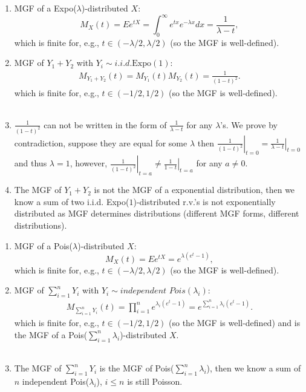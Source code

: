 \begin{Solution}{1.21}
		\begin{enumerate}
			\item   MGF of a Expo($\lambda$)-distributed $X$: $$M_X(t)=Ee^{tX}=\int_{0}^{\infty} e^{tx}e^{-\lambda x} dx=  \frac{1}{\lambda -t},$$ {which is finite for, e.g., $t\in (-\lambda/2, \lambda/2)$ (so the MGF is well-defined)}.
			\item {MGF of $Y_1+Y_2$} with $Y_i\sim i.i.d.\text{Expo}(1)$:
			\begin{align*}
				M_{Y_1+Y_2}(t) = M_{Y_1}(t)M_{Y_2}(t)=\frac{1}{(1 -t)^2}.
			\end{align*}
			{which is finite for, e.g., $t\in (-1/2, 1/2)$ (so the MGF is well-defined).}\\~\\
			\item $\frac{1}{(1 -t)^2}$ can not be written in the form of $\frac{1}{\lambda -t}$ for any $\lambda$'s. We prove by contradiction, suppose they are equal for some $\lambda$ then $\left.\frac{1}{(1 -t)^2}\right|_{t=0}=\left.\frac{1}{\lambda -t}\right|_{t=0}$ and thus $\lambda=1$, however, $\left.\frac{1}{(1 -t)^2}\right|_{t=a}\neq \left.\frac{1}{1 -t}\right|_{t=a}$ for any $a\neq 0$.
			\item {The MGF of  $Y_1+Y_2$ is not the MGF of a exponential distribution}, then we know  a sum of two i.i.d. Expo($1$)-distributed r.v.'s is not exponentially distributed as MGF determines distributions (different MGF forms, different distributions).
		\end{enumerate}
	
\end{Solution}
\begin{Solution}{1.22}
		\begin{enumerate}
				\item {MGF of a Pois($\lambda$)-distributed $X$}: $$M_X(t)=Ee^{tX} =e^{\lambda (e^t-1)},$$ {which is finite for, e.g., $t\in (-\lambda/2, \lambda/2)$ (so the MGF is well-defined)}.
			\item {MGF of $\sum_{i=1}^{n} Y_i$} with $Y_i\sim \textit{independent  Pois}(\lambda_i)$:
			\begin{align*}
				M_{\sum_{i=1}^{n}Y_i}(t) =\prod_{i=1}^{n} e^{\lambda_i (e^t-1) }=e^{\sum_{i=1}^{n} \lambda_i (e^t-1) }.
			\end{align*}
			{which is finite for, e.g., $t\in (-1/2, 1/2)$ (so the MGF is well-defined) and is the MGF of a Pois($\sum_{i=1}^{n} \lambda_i$)-distributed $X$.} \\~\\
			\item The MGF of   $\sum_{i=1}^{n} Y_i$ is  the MGF of Pois($\sum_{i=1}^{n} \lambda_i$), then we know a  sum of $n$ independent Pois($\lambda_i$), $i\leq n$ is still Poisson.
		\end{enumerate}
	
\end{Solution}
